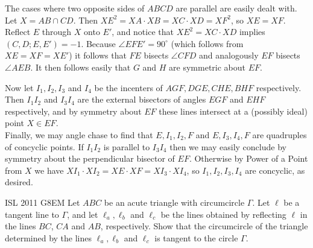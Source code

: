 \begin{solution}[juckter]
    The cases where two opposite sides of $ABCD$ are parallel are easily dealt
    with. Let $X = AB \cap CD$. Then $XE^2 = XA \cdot XB = XC \cdot XD =
    XF^2$, so $XE = XF$. Reflect $E$ through $X$ onto $E'$, and notice that
    $XE^2 = XC \cdot XD$ implies $(C, D; E, E') = -1$. Because $\angle EFE' =
    90^{\circ}$ (which follows from $XE = XF = XE'$) it follows that $FE$
    bisects $\angle CFD$ and analogously $EF$ bisects $\angle AEB$. It then
    follows easily that $G$ and $H$ are symmetric about $EF$.\\


    Now let $I_1, I_2, I_3$ and $I_4$ be the incenters of $AGF, DGE, CHE, BHF$
    respectively. Then $I_1I_2$ and $I_3I_4$ are the external bisectors of
    angles $EGF$ and $EHF$ respectively, and by symmetry about $EF$ these
    lines intersect at a (possibly ideal) point $X \in EF$.\\

    Finally, we may angle chase to find that $E, I_1, I_2, F$ and $E, I_3,
    I_4, F$ are quadruples of concyclic points. If $I_1I_2$ is parallel to
    $I_3I_4$ then we may easily conclude by symmetry about the perpendicular
    bisector of $EF$. Otherwise by Power of a Point from $X$ we have $XI_1
    \cdot XI_2 = XE \cdot XF = XI_3 \cdot XI_4$, so $I_1, I_2, I_3, I_4$ are
    concyclic, as desired.
\end{solution}







{ISL 2011 G8}{EM}{
    Let $ABC$ be an acute triangle with circumcircle $\Gamma$. Let $\ell$
    be a tangent line to $\Gamma$, and let $\ell_a, \ell_b$ and $\ell_c$ be the
    lines obtained by reflecting $\ell$ in the lines $BC$, $CA$ and $AB$,
    respectively. Show that the circumcircle of the triangle determined by the
    lines $\ell_a, \ell_b$ and $\ell_c$ is tangent to the circle $\Gamma$.
}





